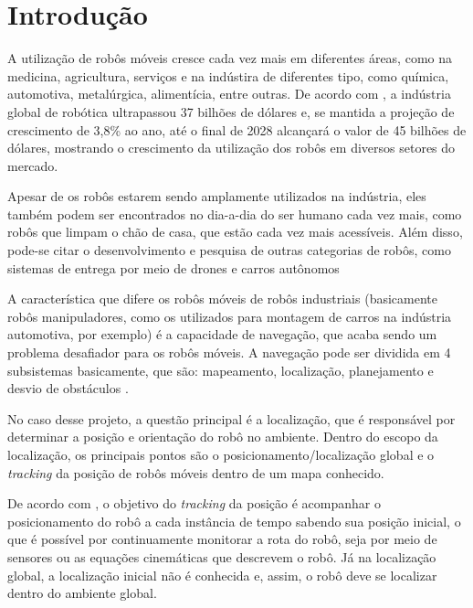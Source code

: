 \documentclass[acronym, symbols, table]{fei}
\begin{document}
\chapter{Introdução}

	A utilização de robôs móveis cresce cada vez mais em diferentes áreas, como na medicina, agricultura, serviços e na indústira de diferentes tipo, como química, automotiva, metalúrgica, alimentícia, entre outras. De acordo com \textcite{robotics_market}, a indústria global de robótica ultrapassou 37 bilhões de dólares e, se mantida a projeção de crescimento de 3,8\% ao ano, até o final de 2028 alcançará o valor de 45 bilhões de dólares, mostrando o crescimento da utilização dos robôs em diversos setores do mercado.
	
	Apesar de os robôs estarem sendo amplamente utilizados na indústria, eles também podem ser encontrados no dia-a-dia do ser humano cada vez mais, como robôs que limpam o chão de casa, que estão cada vez mais acessíveis. Além disso, pode-se citar o desenvolvimento e pesquisa de outras categorias de robôs, como sistemas de entrega por meio de drones \cite{su14010360} e carros autônomos \cite{parekh2022review}
	
	A característica que difere os robôs móveis de robôs industriais (basicamente robôs manipuladores, como os utilizados para montagem de carros na indústria automotiva, por exemplo) é a capacidade de navegação, que acaba sendo um problema desafiador para os robôs móveis. A navegação pode ser dividida em 4 subsistemas basicamente, que são: mapeamento, localização, planejamento e desvio de obstáculos \cite{app12146951}. 
	
	No caso desse projeto, a questão principal é a localização, que é responsável por determinar a posição e orientação do robô no ambiente. Dentro do escopo da localização, os principais pontos são o posicionamento/localização global e o \textit{tracking} da posição de robôs móveis dentro de um mapa conhecido.
	
	De acordo com \textcite{PANIGRAHI20226019}, o objetivo do \textit{tracking} da posição é acompanhar o posicionamento do robô a cada instância de tempo sabendo sua posição inicial, o que é possível por continuamente monitorar a rota do robô, seja por meio de sensores ou as equações cinemáticas que descrevem o robô. Já na localização global, a localização inicial não é conhecida e, assim, o robô deve se localizar dentro do ambiente global.
	
	
\end{document}
